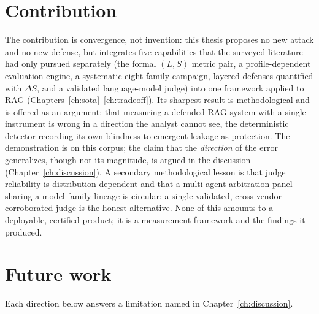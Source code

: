\section{Contribution}
\label{sec:concl-contribution}

The contribution is convergence, not invention: this thesis proposes no new attack and no new
defense, but integrates five capabilities that the surveyed literature had only pursued
separately (the formal $(L,S)$ metric pair, a profile-dependent evaluation engine, a
systematic eight-family campaign, layered defenses quantified with $\Delta S$, and a validated
language-model judge) into one framework applied to RAG (Chapters~\ref{ch:sota}--\ref{ch:tradeoff}).
Its sharpest result is methodological and is offered as an argument: that measuring a defended
RAG system with a single instrument is wrong in a direction the analyst cannot see, the
deterministic detector recording its own blindness to emergent leakage as protection. The
demonstration is on this corpus; the claim that the \emph{direction} of the error generalizes,
though not its magnitude, is argued in the discussion (Chapter~\ref{ch:discussion}). A
secondary methodological lesson is that judge reliability is distribution-dependent and that a
multi-agent arbitration panel sharing a model-family lineage is circular; a single validated,
cross-vendor-corroborated judge is the honest alternative. None of this amounts to a deployable,
certified product; it is a measurement framework and the findings it produced.

\section{Future work}
\label{sec:concl-future}

Each direction below answers a limitation named in Chapter~\ref{ch:discussion}.

